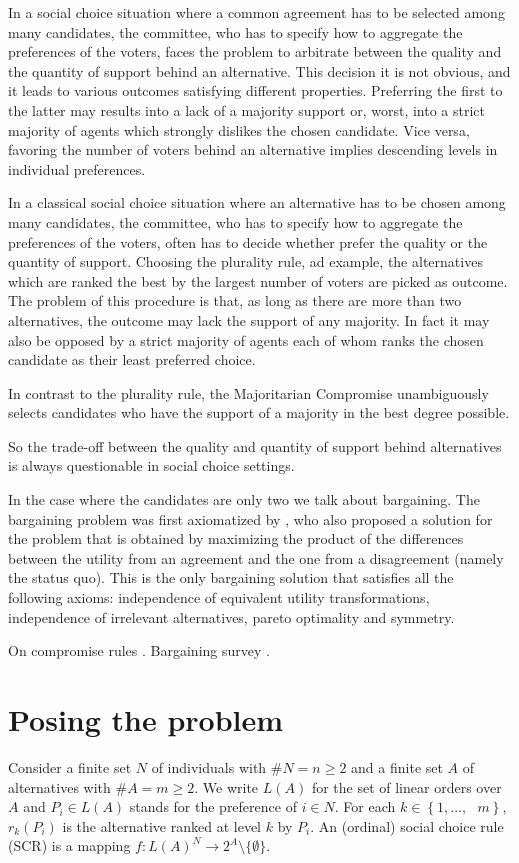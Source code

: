 \documentclass[version=3.21, pagesize, notitlepage, twoside=off, bibliography=totoc, DIV=calc, fontsize=12pt, a4paper]{scrartcl}
\begin{document}
	
	In a social choice situation where a common agreement has to be selected among many candidates, the committee, who has to specify how to aggregate the preferences of the voters, faces the problem to arbitrate between the quality and the quantity of support behind an alternative. This decision it is not obvious, and it leads to various outcomes satisfying different properties. Preferring the first to the latter may results into a lack of a majority support or, worst, into a strict majority of agents which strongly dislikes the chosen candidate. Vice versa, favoring the number of voters behind an alternative implies descending levels in individual preferences. 

In a classical social choice situation where an alternative has to be chosen among many candidates, the committee, who has to specify how to aggregate the preferences of the voters, often has to decide whether prefer the quality or the quantity of support. Choosing the plurality rule, ad example, the alternatives which are ranked the best by the largest number of voters are picked as outcome. The problem of this procedure is that, as long as there are more than two alternatives, the outcome may lack the support of any majority. In fact it may also be opposed by a strict majority of agents each of whom ranks the chosen candidate as their least preferred choice. 

In contrast to the plurality rule, the Majoritarian Compromise \cite{Sertel1999} unambiguously selects candidates who have the support of a majority in the best degree possible.

So the trade-off between the quality and quantity of support behind alternatives is always questionable in social choice settings.

In the case where the candidates are only two we talk about bargaining. The bargaining problem was first axiomatized by \cite{Nash1950}, who also proposed a solution for the problem that is obtained by maximizing the product of the differences between the utility from an agreement and the one from a disagreement (namely the status quo). This is the only bargaining solution that satisfies all the following axioms: independence of equivalent utility transformations, independence of irrelevant alternatives, pareto optimality and symmetry.

On compromise rules \cite{Merlin2019}. Bargaining survey \cite{Thomson1994}.
	
\section{Posing the problem}
Consider a finite set $N$ of individuals with $\#N=n\geq 2$ and a finite set $A$ of alternatives with $\#A=m\geq 2$. We write $L(A)$ for the set of linear orders over $A$ and $P_{i}\in L(A)$ stands for the preference of $i\in N$. For each $k\in \left\{ 1,...,\text{ }m\right\} $, $r_{k}(P_{i})$ is the alternative ranked at level $k$ by $P_{i}$. An (ordinal) social choice rule (SCR) is a mapping $f:L(A)^{N}\rightarrow 2^{A} \setminus \{\emptyset \}$.
\end{document}
